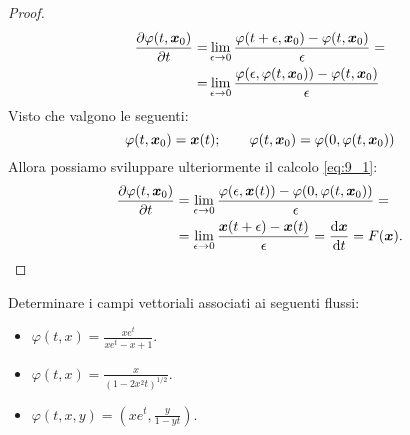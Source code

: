 \noindent
\begin{proof}
    \begin{equation}
    \begin{aligned}
	\frac{\partial \varphi (t, \boldsymbol{x}_0)}{\partial t} =&
	\lim_{\epsilon \to 0}  \frac{\varphi (t+\epsilon, \boldsymbol{x}_0)- \varphi (t, \boldsymbol{x}_0)}{\epsilon}=\\
	=& \lim_{\epsilon \to 0} \frac{\varphi (\epsilon, \varphi (t, \boldsymbol{x}_0))- \varphi (t, \boldsymbol{x}_0)}{\epsilon}
	\label{eq:9_1}
    \end{aligned}
    \end{equation}
Visto che valgono le seguenti:
\[
    \varphi (t,\boldsymbol{x}_0)=\boldsymbol{x} (t); \qquad \varphi (t, \boldsymbol{x}_0)=\varphi (0, \varphi (t, \boldsymbol{x}_0))
\] 
Allora possiamo sviluppare ulteriormente il calcolo \ref{eq:9_1}:
\[\begin{aligned}
    \frac{\partial \varphi (t, \boldsymbol{x}_0)}{\partial t} &= 
    \lim_{\epsilon \to 0} \frac{\varphi (\epsilon, \boldsymbol{x}(t)) - \varphi (0, \varphi (t, \boldsymbol{x}_0))}{\epsilon} = \\
							&= \lim_{\epsilon \to 0} \frac{\boldsymbol{x}(t + \epsilon) - \boldsymbol{x} (t)}{\epsilon} =
							\frac{\text{d} \boldsymbol{x}}{\text{d} t} =F(\boldsymbol{x})
.\end{aligned}\]
\end{proof}
\noindent
\begin{ex}
    Determinare i campi vettoriali associati ai seguenti flussi:
    \begin{itemize}
	\item $\varphi (t, x) = \frac{x e^{t}}{xe^t - x + 1}$.
	\item $\varphi (t, x) = \frac{x}{(1-2x^2t)^{1 /2}}$.
	\item $\varphi (t, x, y) = (xe^t, \frac{y}{1-yt})$.
    \end{itemize}
\end{ex}
\noindent
